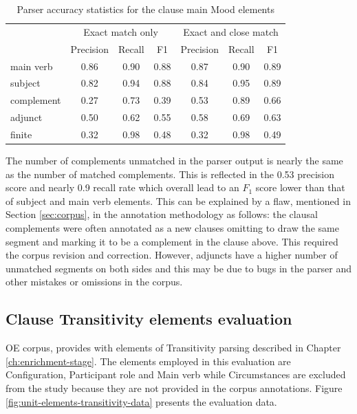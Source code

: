     \begin{table}[!ht]
    \centering
    \begin{tabular}{lcccccc}
    \toprule
     & \multicolumn{3}{c}{Exact match only} & \multicolumn{3}{c}{Exact and close match} \\ \cline{2-7} 
     & Precision & Recall & F1 & Precision & Recall & F1 \\ 
    \midrule
    main verb & 0.86 & 0.90 & 0.88 & 0.87 & 0.90 & 0.89 \\
    subject & 0.82 & 0.94 & 0.88 & 0.84 & 0.95 & 0.89 \\
    complement & 0.27 & 0.73 & 0.39 & 0.53 & 0.89 & 0.66 \\
    adjunct & 0.50 & 0.62 & 0.55 & 0.58 & 0.69 & 0.63 \\
    finite & 0.32 & 0.98 & 0.48 & 0.32 & 0.98 & 0.49 \\
    \bottomrule
    \end{tabular}
    \caption{Parser accuracy statistics for the clause main Mood elements}
    \label{tab:unit-elements-mood-combined-F1}
    \end{table}
    
    The number of complements unmatched in the parser output is nearly the same as the number of matched complements. This is reflected in the 0.53 precision score and nearly 0.9 recall rate which overall lead to an $F_1$ score lower than that of subject and main verb elements. This can be explained by a flaw, mentioned in Section \ref{sec:corpus}, in the annotation methodology as follows: the clausal complements were often annotated as a new clauses omitting to draw the same segment and marking it to be a complement in the clause above. This required the corpus revision and correction. However, adjuncts have a higher number of unmatched segments on both sides and this may be due to bugs in the parser and other mistakes or omissions in the corpus.
    
\subsection{Clause Transitivity elements evaluation}
\label{sec:unit-transitivity-element-evaluation}

    OE corpus, provides with elements of Transitivity parsing described in Chapter \ref{ch:enrichment-stage}. The elements employed in this evaluation are Configuration, Participant role and Main verb while Circumstances are excluded from the study because they are not provided in the corpus annotations. Figure \ref{fig:unit-elements-transitivity-data} presents the evaluation data. 
    
